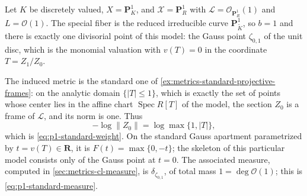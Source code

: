 \begin{example}
\label{ex:metrics-p1-standard-model}
Let $K$ be discretely valued, $X=\mathbf P^1_K$, and
$\mathcal X=\mathbf P^1_R$ with $\mathcal L=\mathcal O_{\mathbf P^1_R}(1)$
and $L=\mathcal O(1)$. The special fiber is the reduced irreducible curve
$\mathbf P^1_{\widetilde K}$, so $b=1$ and there is exactly one
divisorial point of this model: the Gauss point $\zeta_{0,1}$ of the unit
disc, which is the monomial valuation with $v(T)=0$ in the coordinate
$T=Z_1/Z_0$.

The induced metric is the standard one of
\cref{ex:metrics-standard-projective-frames}: on the analytic domain
$\{|T|\le1\}$, which is exactly the set of points whose center lies in the
affine chart $\operatorname{Spec}R[T]$ of the model, the section $Z_0$ is
a frame of $\mathcal L$, and its norm is one. Thus
\[
 -\log\|Z_0\|=\log\max\{1,|T|\},
\]
which is \eqref{eq:p1-standard-weight}. On the standard Gauss apartment
parametrized by $t=v(T)\in\mathbf R$, it is
$F(t)=\max\{0,-t\}$; the skeleton of this particular model consists
only of the Gauss point at $t=0$. The associated measure,
computed in \cref{sec:metrics-cl-measure}, is
$\delta_{\zeta_{0,1}}$, of total mass $1=\deg\mathcal O(1)$; this is
\eqref{eq:p1-standard-measure}.
\end{example}


